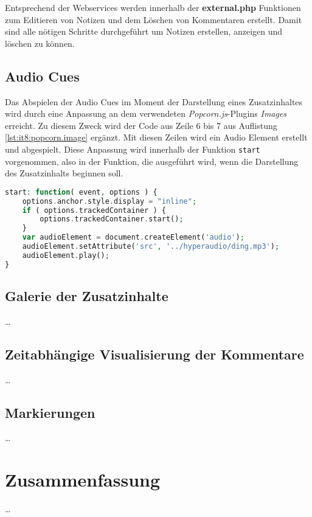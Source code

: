 Entsprechend der Webservices werden innerhalb der \textbf{external.php} Funktionen zum Editieren von Notizen und dem Löschen von Kommentaren erstellt. Damit sind alle nötigen Schritte durchgeführt um Notizen erstellen, anzeigen und löschen zu können.

\subsection{Audio Cues}
Das Abspielen der Audio Cues im Moment der Darstellung eines Zusatzinhaltes wird durch eine Anpassung an dem verwendeten \textit{Popcorn.js}-Plugins \textit{Images} erreicht. Zu diesem Zweck wird der Code aus Zeile 6 bis 7  aus Auflistung \ref{lst:it8:popcorn.image} ergänzt. Mit diesen Zeilen wird ein Audio Element erstellt und abgespielt. Diese Anpassung wird innerhalb der Funktion \texttt{start} vorgenommen, also in der Funktion, die ausgeführt wird, wenn die Darstellung des Zusatzinhalts beginnen soll.

\begin{lstlisting}[language=php,
             linewidth=\textwidth,
             caption={Ausschnitt der \textbf{popcorn.image.js} in der 8. Iteration},
             label={lst:it8:popcorn.image}]
start: function( event, options ) {
	options.anchor.style.display = "inline";
	if ( options.trackedContainer ) {
		options.trackedContainer.start();
	}
	var audioElement = document.createElement('audio');
	audioElement.setAttribute('src', '../hyperaudio/ding.mp3');
	audioElement.play();
}
\end{lstlisting}

\subsection{Galerie der Zusatzinhalte}
\dots

\subsection{Zeitabhängige Visualisierung der Kommentare}
\dots

\subsection{Markierungen}
\dots

%


\section{Zusammenfassung}
\dots